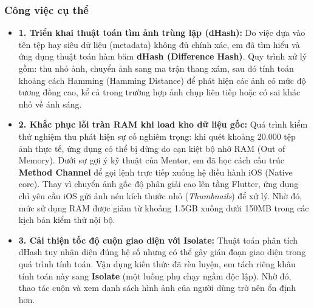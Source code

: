 \documentclass[12pt, a4paper]{article}
\begin{document}
\subsubsection{Công việc cụ thể}
\begin{itemize}
    \item \textbf{1. Triển khai thuật toán tìm ảnh trùng lặp (dHash):} 
    Do việc dựa vào tên tệp hay siêu dữ liệu (metadata) không đủ chính xác, em đã tìm hiểu và ứng dụng thuật toán hàm băm \textbf{dHash (Difference Hash)}. Quy trình xử lý gồm: thu nhỏ ảnh, chuyển ảnh sang ma trận thang xám, sau đó tính toán khoảng cách Hamming (Hamming Distance) để phát hiện các ảnh có mức độ tương đồng cao, kể cả trong trường hợp ảnh chụp liên tiếp hoặc có sai khác nhỏ về ánh sáng.
    
    \item \textbf{2. Khắc phục lỗi tràn RAM khi load kho dữ liệu gốc:} 
    Quá trình kiểm thử nghiệm thu phát hiện sự cố nghiêm trọng: khi quét khoảng 20.000 tệp ảnh thực tế, ứng dụng có thể bị dừng do cạn kiệt bộ nhớ RAM (Out of Memory). Dưới sự gợi ý kỹ thuật của Mentor, em đã học cách cấu trúc \textbf{Method Channel} để gọi lệnh trực tiếp xuống hệ điều hành iOS (Native core). Thay vì chuyển ảnh gốc độ phân giải cao lên tầng Flutter, ứng dụng chỉ yêu cầu iOS gửi ảnh nén kích thước nhỏ (\textit{Thumbnails}) để xử lý. Nhờ đó, mức sử dụng RAM được giảm từ khoảng 1.5GB xuống dưới 150MB trong các kịch bản kiểm thử nội bộ.

    \item \textbf{3. Cải thiện tốc độ cuộn giao diện với Isolate:}
    Thuật toán phân tích dHash tuy nhận diện đúng hệ số nhưng có thể gây gián đoạn giao diện trong quá trình tính toán. Vận dụng kiến thức đã rèn luyện, em tách riêng khâu tính toán này sang \textbf{Isolate} (một luồng phụ chạy ngầm độc lập). Nhờ đó, thao tác cuộn và xem danh sách hình ảnh của người dùng trở nên ổn định hơn.
\end{itemize}
\end{document}
